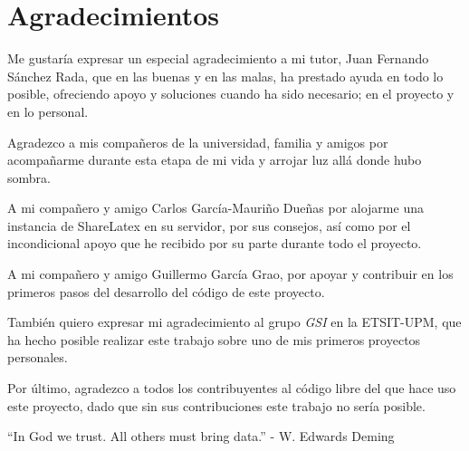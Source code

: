 \cleardoublepage
{}
\chapter*{Agradecimientos}

Me gustaría expresar un especial agradecimiento a mi tutor, Juan Fernando Sánchez Rada, que en las buenas y en las malas, ha prestado ayuda en todo lo posible, ofreciendo apoyo y soluciones cuando ha sido necesario; en el proyecto y en lo personal.

Agradezco a mis compañeros de la universidad, familia y amigos por acompañarme durante esta etapa de mi vida y arrojar luz allá donde hubo sombra.

A mi compañero y amigo Carlos García-Mauriño Dueñas por alojarme una instancia de ShareLatex en su servidor, por sus consejos, así como por el incondicional apoyo que he recibido por su parte durante todo el proyecto.

A mi compañero y amigo Guillermo García Grao, por apoyar y contribuir en los primeros pasos del desarrollo del código de este proyecto.

También quiero expresar mi agradecimiento al grupo {\sl GSI} en la ETSIT-UPM, que ha hecho posible realizar este trabajo sobre uno de mis primeros proyectos personales.

Por último, agradezco a todos los contribuyentes al código libre del que hace uso este proyecto, dado que sin sus contribuciones este trabajo no sería posible.

\begin{flushright}
	``In God we trust. All others must bring data.'' - W. Edwards Deming
\end{flushright}